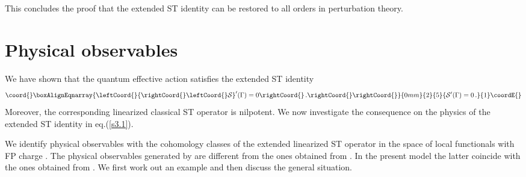 \documentclass[a4paper,11pt]{article}
\def\G{\Gamma}
\begin{document}
This concludes the proof that the extended ST identity can be restored to all orders
in perturbation theory.


\section{Physical observables} \label{sez3}

We have shown that the quantum effective action \myHighlight{$\G$}\coordHE{} satisfies the
extended ST identity
%
\begin{eqnarray}\coord{}\boxAlignEqnarray{\leftCoord{}
{\rightCoord{}\leftCoord{}\cal S}'(\G)=0 \rightCoord{}\, . \rightCoord{}
\label{s3.1}
\rightCoord{}}{0mm}{2}{5}{
{\cal S}'(\G)=0 \, . 
}{1}\coordE{}\end{eqnarray}
%
Moreover, the corresponding linearized classical ST operator
\coordHE{} is nilpotent. 
We now investigate the consequence
on the physics of the extended ST identity in eq.(\ref{s3.1}).

We identify physical observables with the cohomology classes
of the extended linearized ST operator \coordHE{} in the
space of local functionals with FP charge \coordHE{}.
The physical observables generated by \coordHE{} are
different from the ones obtained from \coordHE{}.
In the present model the latter coincide with the ones obtained from \coordHE{}
\cite{anomalies}.
We first work out an example and then discuss the general
situation.
\end{document}
